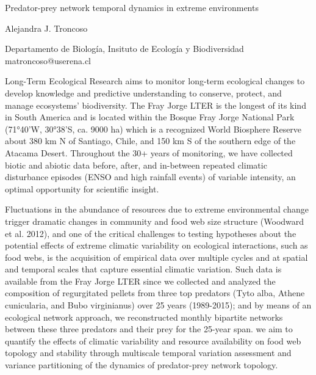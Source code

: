 \documentclass[a4paper]{article}
\begin{document}

\Large
 \begin{center}
Predator-prey network temporal dynamics in extreme environments\\ 

\hspace{10pt}

\large
Alejandra J. Troncoso \\

\hspace{10pt}

\small  
Departamento de Biología, Insituto de Ecología y Biodiversidad\\
matroncoso@userena.cl\\
\end{center}

\hspace{10pt}

\normalsize

Long-Term Ecological Research aims to monitor long-term ecological changes to develop knowledge and predictive understanding to conserve, protect, and manage ecosystems’ biodiversity. The Fray Jorge LTER is the longest of its kind in South America and is located within the Bosque Fray Jorge National Park (71°40’W, 30°38’S, ca. 9000 ha) which is a recognized World Biosphere Reserve about 380 km N of Santiago, Chile, and 150 km S of the southern edge of the Atacama Desert. Throughout the 30+ years of monitoring, we have collected biotic and abiotic data before, after, and in-between repeated climatic disturbance episodes (ENSO and high rainfall events) of variable intensity, an optimal opportunity for scientific insight.

Fluctuations in the abundance of resources due to extreme environmental change trigger dramatic changes in community and food web size structure (Woodward et al. 2012), and one of the critical challenges to testing hypotheses about the potential effects of extreme climatic variability on ecological interactions, such as food webs, is the acquisition of empirical data over multiple cycles and at spatial and temporal scales that capture essential climatic variation. Such data is available from the Fray Jorge LTER since we collected and analyzed the composition of regurgitated pellets from three top predators (Tyto alba, Athene cunicularia, and Bubo virginianus) over 25 years (1989-2015); and by means of an ecological network approach, we reconstructed monthly bipartite networks between these three predators and their prey for the 25-year span. we aim to quantify the effects of climatic variability and resource availability on food web topology and stability through multiscale temporal variation assessment and variance partitioning of the dynamics of predator-prey network topology.
\end{document}
